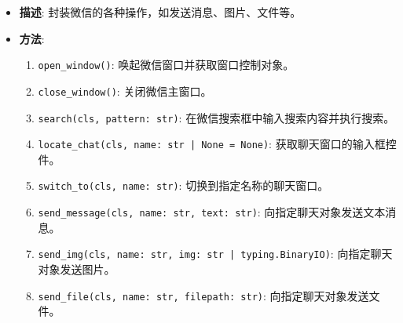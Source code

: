 \begin{itemize}
    \item \textbf{描述}: 封装微信的各种操作，如发送消息、图片、文件等。
    \item \textbf{方法}:
    \begin{enumerate}
        \item \texttt{open\_window()}: 唤起微信窗口并获取窗口控制对象。
        \item \texttt{close\_window()}: 关闭微信主窗口。
        \item \texttt{search(cls, pattern: str)}: 在微信搜索框中输入搜索内容并执行搜索。
        \item \texttt{locate\_chat(cls, name: str | None = None)}: 获取聊天窗口的输入框控件。
        \item \texttt{switch\_to(cls, name: str)}: 切换到指定名称的聊天窗口。
        \item \texttt{send\_message(cls, name: str, text: str)}: 向指定聊天对象发送文本消息。
        \item \texttt{send\_img(cls, name: str, img: str | typing.BinaryIO)}: 向指定聊天对象发送图片。
        \item \texttt{send\_file(cls, name: str, filepath: str)}: 向指定聊天对象发送文件。
    \end{enumerate}
\end{itemize}
